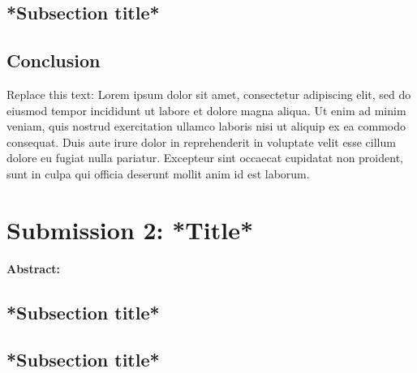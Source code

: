 \documentclass[a4paper, 11pt]{article}
\begin{document}
\vspace{0.5cm}
\subsection{*Subsection title*}



\vspace{0.5cm}
\subsection{Conclusion}

Replace this text: Lorem ipsum dolor sit amet, consectetur adipiscing elit, sed do eiusmod tempor incididunt ut labore et dolore magna aliqua. Ut enim ad minim veniam, quis nostrud exercitation ullamco laboris nisi ut aliquip ex ea commodo consequat. Duis aute irure dolor in reprehenderit in voluptate velit esse cillum dolore eu fugiat nulla pariatur. Excepteur sint occaecat cupidatat non proident, sunt in culpa qui officia deserunt mollit anim id est laborum.






\newpage
\section{Submission 2: *Title*}

\textbf{Abstract: }




\vspace{0.5cm}
\subsection{*Subsection title*}




\vspace{0.5cm}
\subsection{*Subsection title*}
\end{document}
